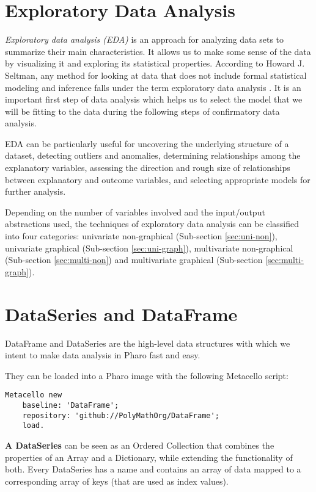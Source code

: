 \documentclass[sigplan]{acmart}
\begin{document}
\section{Exploratory Data Analysis}
\label{sec:eda}
\textit{Exploratory data analysis (EDA)} is an approach for analyzing data sets to summarize their main characteristics. It allows us to make some sense of the data by visualizing it and exploring its statistical properties.
According to Howard J. Seltman, any method for looking at data that does not include formal statistical modeling and inference falls under the term exploratory data analysis \cite{Seltman}. It is an important first step of data analysis which helps us to select the model that we will be fitting to the data during the following steps of confirmatory data analysis.

EDA can be particularly useful for uncovering the underlying structure of a dataset, detecting outliers and anomalies, determining relationships among the explanatory variables, assessing the direction and rough size of relationships between explanatory and outcome variables, and selecting appropriate models for further analysis\cite{eStats}.

Depending on the number of variables involved and the input/output abstractions used, the techniques of exploratory data analysis can be classified into four categories: univariate non-graphical (Sub-section \ref{sec:uni-non}), univariate graphical (Sub-section \ref{sec:uni-graph}), multivariate non-graphical (Sub-section \ref{sec:multi-non}) and multivariate graphical (Sub-section \ref{sec:multi-graph}).

\section{DataSeries and DataFrame}
\label{sec:dataframe}
DataFrame and DataSeries are the high-level data structures with which we intent to make data analysis in Pharo fast and easy.%

They can be loaded into a Pharo image with the following Metacello script:

\begin{lstlisting}[basicstyle=\small,language=Smalltalk]
Metacello new
    baseline: 'DataFrame';
    repository: 'github://PolyMathOrg/DataFrame';
    load.
\end{lstlisting}

\textbf{A DataSeries} can be seen as an Ordered Collection that combines the properties of an Array and a Dictionary, while extending the functionality of both. Every DataSeries has a name and contains an array of data mapped to a corresponding array of keys (that are used as index values).
\end{document}
